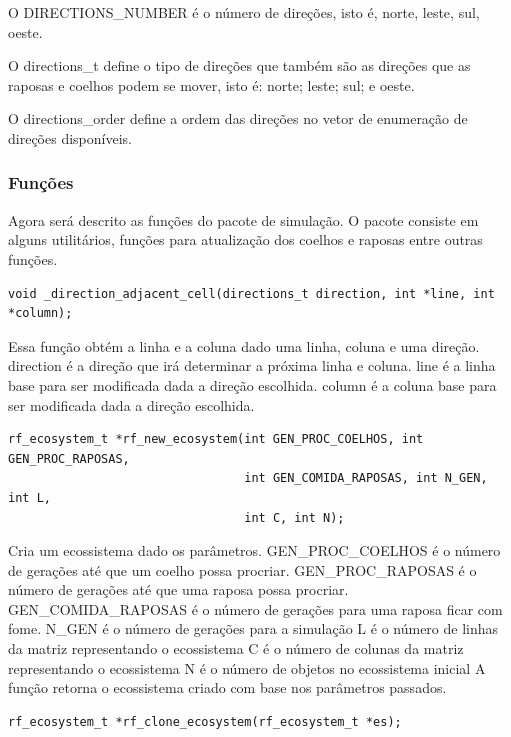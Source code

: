 \documentclass[12pt]{article}
\begin{document}
O DIRECTIONS\_NUMBER é o número de direções, isto é, norte, leste, sul, oeste.

O directions\_t define o tipo de direções que também são as direções que as raposas e coelhos podem se mover, isto é: norte; leste; sul; e oeste.

O directions\_order define a ordem das direções no vetor de enumeração de direções disponíveis.

\subsubsection{Funções}

Agora será descrito as funções do pacote de simulação. O pacote consiste em alguns utilitários, funções para atualização dos coelhos e raposas entre outras funções.

\begin{verbatim}
void _direction_adjacent_cell(directions_t direction, int *line, int *column);
      \end{verbatim}

Essa função obtém a linha e a coluna dado uma linha, coluna e uma direção. direction é a direção que irá determinar a próxima linha e coluna. line é a linha base para ser modificada dada a direção escolhida. column é a coluna base para ser modificada dada a direção escolhida.

\begin{verbatim}
rf_ecosystem_t *rf_new_ecosystem(int GEN_PROC_COELHOS, int GEN_PROC_RAPOSAS,
                                 int GEN_COMIDA_RAPOSAS, int N_GEN, int L,
                                 int C, int N);
      \end{verbatim}

Cria um ecossistema dado os parâmetros.
GEN\_PROC\_COELHOS é o número de gerações até que um coelho possa procriar.
GEN\_PROC\_RAPOSAS é o número de gerações até que uma raposa possa procriar.
GEN\_COMIDA\_RAPOSAS é o número de gerações para uma raposa ficar com fome.
N\_GEN é o número de gerações para a simulação
L é o número de linhas da matriz representando o ecossistema
C é o número de colunas da matriz representando o ecossistema
N é o número de objetos no ecossistema inicial
A função retorna o ecossistema criado com base nos parâmetros passados.


\begin{verbatim}
rf_ecosystem_t *rf_clone_ecosystem(rf_ecosystem_t *es);
      \end{verbatim}
\end{document}
